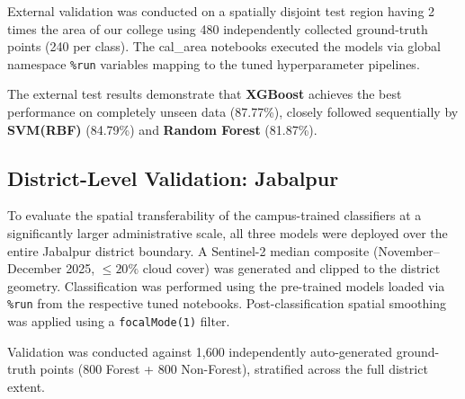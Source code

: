 \documentclass[12pt, a4paper, twocolumn]{article}
\begin{document}
External validation was conducted on a spatially disjoint test region having 2 times the area of our college using 480 independently collected ground-truth points (240 per class). The cal\_area notebooks executed the models via global namespace \texttt{\%run} variables mapping to the tuned hyperparameter pipelines.

\begin{table}[H]
\centering
\caption{External validation results on unseen test area (240 per class).}
\label{tab:external}
\end{table}

The external test results demonstrate that \textbf{XGBoost} achieves the best performance on completely unseen data (87.77\%), closely followed sequentially by \textbf{SVM(RBF)} (84.79\%) and \textbf{Random Forest} (81.87\%). 

\subsection{District-Level Validation: Jabalpur}
\label{subsec:jbp_results}

To evaluate the spatial transferability of the campus-trained classifiers at a significantly larger administrative scale, all three models were deployed over the entire Jabalpur district boundary. A Sentinel-2 median composite (November--December 2025, $\leq 20\%$ cloud cover) was generated and clipped to the district geometry. Classification was performed using the pre-trained models loaded via \texttt{\%run} from the respective tuned notebooks. Post-classification spatial smoothing was applied using a \texttt{focalMode(1)} filter.

Validation was conducted against 1,600 independently auto-generated ground-truth points (800 Forest + 800 Non-Forest), stratified across the full district extent.
\end{document}
